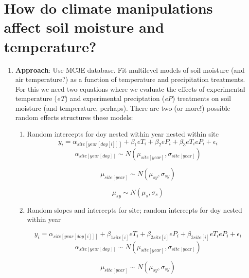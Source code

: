 \documentclass{article}
\begin{document}
\section{How do climate manipulations affect soil moisture and temperature?}
\begin{singlespace}

\begin{enumerate}
\item{\textbf{Approach}: Use MC3E database. Fit multilevel models of soil moisture (and air temperature?) as a function of temperature and precipitation treatments.}
\noindent For this we need two equations where we evaluate the effects of experimental temperature (\textit{eT}) and experimental preciptation (\textit{eP}) treatments on soil moisture (and temperature, perhaps). There are two (or more!) possible random effects structures these models:
\begin{enumerate}

\item{Random intercepts for doy nested within year nested within site}
\begin{equation}
y_{i}=\alpha_{site[year[doy[i]]]}+ \beta_{1}eT_i+\beta_{2}eP_i+\beta_{3}eT_ieP_i+\epsilon_{i}
\end{equation}
\begin{equation}
\alpha_{site[year[doy]]}\sim N(\mu_{site[year]}, \sigma_{site[year]})
\end{equation}

\begin{equation}
\mu_{site[year]} \sim N(\mu_{sy}, \sigma_{sy})
\end{equation}

\begin{equation}
\mu_{sy} \sim N(\mu_{s}, \sigma_{s})
\end{equation}


\item{Random slopes and intercepts for site; random intercepts for doy nested within year}

\begin{equation}
y_{i}=\alpha_{site[year[doy[i]]]}+ \beta_{1 site[i]}eT_i+\beta_{2 site[i]}eP_i+\beta_{3 site[i]}eT_ieP_i+\epsilon_{i}
\end{equation}
\begin{equation}
\alpha_{site[year[doy]]}\sim N(\mu_{site[year]}, \sigma_{site[year]})
\end{equation}

\begin{equation}
\mu_{site[year]} \sim N(\mu_{sy}, \sigma_{sy})
\end{equation}


\end{enumerate}
\end{enumerate}
\end{singlespace}
\end{document}
